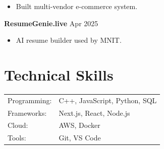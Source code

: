 \documentclass[a4paper,10pt]{article}
\begin{document}
\begin{itemize}[nosep]

\item Built multi-vendor e-commerce system.

\end{itemize}



\textbf{ResumeGenie.live} \hfill Apr 2025

\begin{itemize}[nosep]

\item AI resume builder used by MNIT.

\end{itemize}




\section{Technical Skills}

\begin{tabularx}{\linewidth}{@{}l X@{}}

Programming: & C++, JavaScript, Python, SQL \\

Frameworks: & Next.js, React, Node.js \\

Cloud: & AWS, Docker \\

Tools: & Git, VS Code \\

\end{tabularx}
\end{document}
